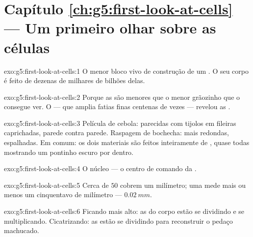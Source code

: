 \section*{Capítulo \ref{ch:g5:first-look-at-cells} --- Um primeiro olhar sobre as células}

\begin{solution}{exo:g5:first-look-at-cells:1}
O menor bloco vivo de construção de um . O seu corpo é feito
de dezenas de milhares de bilhões delas.
\end{solution}

\begin{solution}{exo:g5:first-look-at-cells:2}
Porque as  são menores que o menor grãozinho que o 
consegue ver. O  --- que amplia fatias finas centenas de
vezes --- revelou as .
\end{solution}

\begin{solution}{exo:g5:first-look-at-cells:3}
Película de cebola:  parecidas com tijolos em fileiras
caprichadas, parede contra parede. Raspagem de bochecha:  mais
redondas, espalhadas. Em comum: os dois materiais são feitos
inteiramente de , quase todas mostrando um pontinho escuro por
dentro.
\end{solution}

\begin{solution}{exo:g5:first-look-at-cells:4}
O núcleo --- o centro de comando da .
\end{solution}

\begin{solution}{exo:g5:first-look-at-cells:5}
Cerca de $50$  cobrem um milímetro; uma  mede mais ou
menos um cinquentavo de milímetro --- $\qty{0.02}{mm}$.
\end{solution}

\begin{solution}{exo:g5:first-look-at-cells:6}
Ficando mais alto: as  do corpo estão se dividindo e se
multiplicando. Cicatrizando: as  estão se dividindo para
reconstruir o pedaço machucado.
\end{solution}

